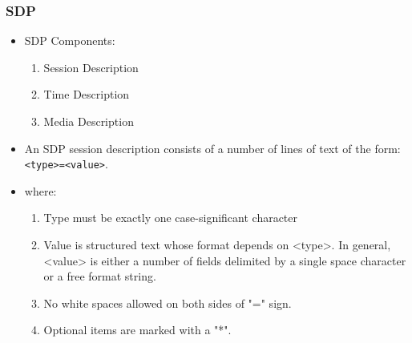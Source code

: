 \begin{frame}[fragile]\frametitle{SDP}
\begin{itemize}
\item SDP Components:
  \begin{enumerate}
  \item Session Description
  \item Time Description
  \item Media Description
  \end{enumerate}
\item An SDP session description consists of a number of lines of text of the form:
\texttt{<type>=<value>}.

\item  where:
  \begin{enumerate}
  \item Type  must be exactly one case-significant character 
  \item Value is structured text whose format depends on <type>.  
  In general, <value> is either a number of fields delimited by a single space character or a free format string.  
  \item No white spaces allowed on both sides of "=" sign.
  \item Optional items are marked with a "*".
  \end{enumerate}
\end{itemize}
\end{frame}

